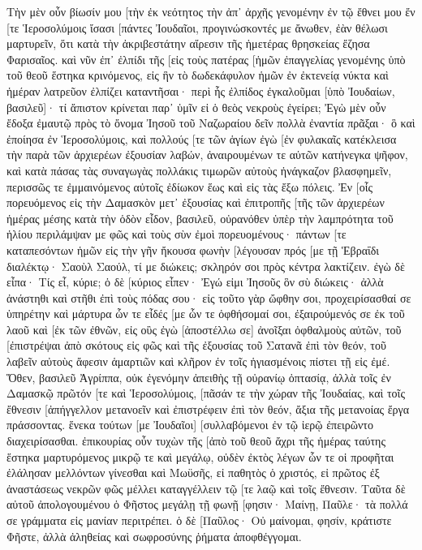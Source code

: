 Τὴν μὲν οὖν βίωσίν μου [τὴν ἐκ νεότητος τὴν ἀπ᾽ ἀρχῆς γενομένην ἐν τῷ ἔθνει μου ἔν [τε Ἱεροσολύμοις ἴσασι [πάντες Ἰουδαῖοι, 
προγινώσκοντές με ἄνωθεν, ἐὰν θέλωσι μαρτυρεῖν, ὅτι κατὰ τὴν ἀκριβεστάτην αἵρεσιν τῆς ἡμετέρας θρησκείας ἔζησα Φαρισαῖος. 
καὶ νῦν ἐπ᾽ ἐλπίδι τῆς [εἰς τοὺς πατέρας [ἡμῶν ἐπαγγελίας γενομένης ὑπὸ τοῦ θεοῦ ἕστηκα κρινόμενος, 
εἰς ἣν τὸ δωδεκάφυλον ἡμῶν ἐν ἐκτενείᾳ νύκτα καὶ ἡμέραν λατρεῦον ἐλπίζει καταντῆσαι· περὶ ἧς ἐλπίδος ἐγκαλοῦμαι [ὑπὸ Ἰουδαίων, βασιλεῦ]· 
τί ἄπιστον κρίνεται παρ᾽ ὑμῖν εἰ ὁ θεὸς νεκροὺς ἐγείρει; 
Ἐγὼ μὲν οὖν ἔδοξα ἐμαυτῷ πρὸς τὸ ὄνομα Ἰησοῦ τοῦ Ναζωραίου δεῖν πολλὰ ἐναντία πρᾶξαι· 
ὃ καὶ ἐποίησα ἐν Ἱεροσολύμοις, καὶ πολλούς [τε τῶν ἁγίων ἐγὼ [ἐν φυλακαῖς κατέκλεισα τὴν παρὰ τῶν ἀρχιερέων ἐξουσίαν λαβών, ἀναιρουμένων τε αὐτῶν κατήνεγκα ψῆφον, 
καὶ κατὰ πάσας τὰς συναγωγὰς πολλάκις τιμωρῶν αὐτοὺς ἠνάγκαζον βλασφημεῖν, περισσῶς τε ἐμμαινόμενος αὐτοῖς ἐδίωκον ἕως καὶ εἰς τὰς ἔξω πόλεις. 
Ἐν [οἷς πορευόμενος εἰς τὴν Δαμασκὸν μετ᾽ ἐξουσίας καὶ ἐπιτροπῆς [τῆς τῶν ἀρχιερέων 
ἡμέρας μέσης κατὰ τὴν ὁδὸν εἶδον, βασιλεῦ, οὐρανόθεν ὑπὲρ τὴν λαμπρότητα τοῦ ἡλίου περιλάμψαν με φῶς καὶ τοὺς σὺν ἐμοὶ πορευομένους· 
πάντων [τε καταπεσόντων ἡμῶν εἰς τὴν γῆν ἤκουσα φωνὴν [λέγουσαν πρός [με τῇ Ἑβραΐδι διαλέκτῳ· Σαοὺλ Σαούλ, τί με διώκεις; σκληρόν σοι πρὸς κέντρα λακτίζειν. 
ἐγὼ δὲ εἶπα· Τίς εἶ, κύριε; ὁ δὲ [κύριος εἶπεν· Ἐγώ εἰμι Ἰησοῦς ὃν σὺ διώκεις· 
ἀλλὰ ἀνάστηθι καὶ στῆθι ἐπὶ τοὺς πόδας σου· εἰς τοῦτο γὰρ ὤφθην σοι, προχειρίσασθαί σε ὑπηρέτην καὶ μάρτυρα ὧν τε εἶδές [με ὧν τε ὀφθήσομαί σοι, 
ἐξαιρούμενός σε ἐκ τοῦ λαοῦ καὶ [ἐκ τῶν ἐθνῶν, εἰς οὓς ἐγὼ [ἀποστέλλω σε] 
ἀνοῖξαι ὀφθαλμοὺς αὐτῶν, τοῦ [ἐπιστρέψαι ἀπὸ σκότους εἰς φῶς καὶ τῆς ἐξουσίας τοῦ Σατανᾶ ἐπὶ τὸν θεόν, τοῦ λαβεῖν αὐτοὺς ἄφεσιν ἁμαρτιῶν καὶ κλῆρον ἐν τοῖς ἡγιασμένοις πίστει τῇ εἰς ἐμέ. 
Ὅθεν, βασιλεῦ Ἀγρίππα, οὐκ ἐγενόμην ἀπειθὴς τῇ οὐρανίῳ ὀπτασίᾳ, 
ἀλλὰ τοῖς ἐν Δαμασκῷ πρῶτόν [τε καὶ Ἱεροσολύμοις, [πᾶσάν τε τὴν χώραν τῆς Ἰουδαίας, καὶ τοῖς ἔθνεσιν [ἀπήγγελλον μετανοεῖν καὶ ἐπιστρέφειν ἐπὶ τὸν θεόν, ἄξια τῆς μετανοίας ἔργα πράσσοντας. 
ἕνεκα τούτων [με Ἰουδαῖοι] [συλλαβόμενοι ἐν τῷ ἱερῷ ἐπειρῶντο διαχειρίσασθαι. 
ἐπικουρίας οὖν τυχὼν τῆς [ἀπὸ τοῦ θεοῦ ἄχρι τῆς ἡμέρας ταύτης ἕστηκα μαρτυρόμενος μικρῷ τε καὶ μεγάλῳ, οὐδὲν ἐκτὸς λέγων ὧν τε οἱ προφῆται ἐλάλησαν μελλόντων γίνεσθαι καὶ Μωϋσῆς, 
εἰ παθητὸς ὁ χριστός, εἰ πρῶτος ἐξ ἀναστάσεως νεκρῶν φῶς μέλλει καταγγέλλειν τῷ [τε λαῷ καὶ τοῖς ἔθνεσιν. 
Ταῦτα δὲ αὐτοῦ ἀπολογουμένου ὁ Φῆστος μεγάλῃ τῇ φωνῇ [φησιν· Μαίνῃ, Παῦλε· τὰ πολλά σε γράμματα εἰς μανίαν περιτρέπει. 
ὁ δὲ [Παῦλος· Οὐ μαίνομαι, φησίν, κράτιστε Φῆστε, ἀλλὰ ἀληθείας καὶ σωφροσύνης ῥήματα ἀποφθέγγομαι. 
